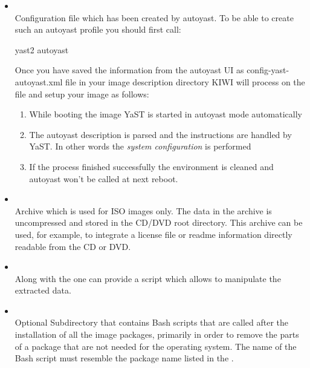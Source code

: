 \begin{itemize}
\item {}\\
      Configuration file which has been created by autoyast.
      To be able to create such an autoyast profile you should first
      call:

\begin{Command}{8cm}
yast2 autoyast
\end{Command}

      Once you have saved the information from the autoyast UI as
      config-yast-autoyast.xml file in your image description directory KIWI
      will process on the file and setup your image as follows:
      \begin{enumerate}
      \item While booting the image YaST is started in autoyast mode
            automatically
      \item The autoyast description is parsed and the instructions are
            handled by YaST. In other words the \emph{system configuration}
            is performed
      \item If the process finished successfully the environment is
            cleaned and autoyast won't be called at next reboot.
      \end{enumerate}

\item {}\\
      Archive which is used for ISO images only. The data in the archive is
      uncompressed and stored in the CD/DVD root directory. This
      archive can be used, for example, to integrate a license file or
      readme information directly readable from the CD or DVD.

\item {}\\
      Along with the  one can provide a script which allows
      to manipulate the extracted data.

\item {}\\
      Optional Subdirectory that contains Bash scripts that are called
      after the installation of all the image packages, primarily in order
      to remove the parts of a package that are not needed for the operating
      system. The name of the Bash script must resemble the package name
      listed in the .
\end{itemize}

